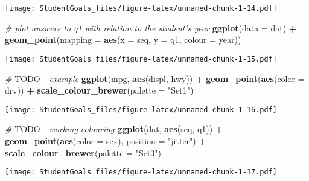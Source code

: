 \documentclass[]{article}
\newenvironment{Shaded}{\begin{snugshade}}{\end{snugshade}}
\newcommand{\AlertTok}[1]{\textcolor[rgb]{0.94,0.16,0.16}{#1}}
\newcommand{\CommentTok}[1]{\textcolor[rgb]{0.56,0.35,0.01}{\textit{#1}}}
\newcommand{\DataTypeTok}[1]{\textcolor[rgb]{0.13,0.29,0.53}{#1}}
\newcommand{\KeywordTok}[1]{\textcolor[rgb]{0.13,0.29,0.53}{\textbf{#1}}}
\newcommand{\NormalTok}[1]{#1}
\newcommand{\OperatorTok}[1]{\textcolor[rgb]{0.81,0.36,0.00}{\textbf{#1}}}
\newcommand{\StringTok}[1]{\textcolor[rgb]{0.31,0.60,0.02}{#1}}
\begin{document}
\texttt{[image: StudentGoals\_files/figure-latex/unnamed-chunk-1-14.pdf]}

\begin{Shaded}
\begin{Highlighting}[]
\CommentTok{# plot answers to q1 with relation to the student's year}
\KeywordTok{ggplot}\NormalTok{(}\DataTypeTok{data =}\NormalTok{ dat) }\OperatorTok{+}\StringTok{ }
\StringTok{  }\KeywordTok{geom_point}\NormalTok{(}\DataTypeTok{mapping =} \KeywordTok{aes}\NormalTok{(}\DataTypeTok{x =}\NormalTok{ seq, }\DataTypeTok{y =}\NormalTok{ q1, }\DataTypeTok{colour =}\NormalTok{ year))}
\end{Highlighting}
\end{Shaded}

\texttt{[image: StudentGoals\_files/figure-latex/unnamed-chunk-1-15.pdf]}

\begin{Shaded}
\begin{Highlighting}[]
\CommentTok{# }\AlertTok{TODO}\CommentTok{ - example}
\KeywordTok{ggplot}\NormalTok{(mpg, }\KeywordTok{aes}\NormalTok{(displ, hwy)) }\OperatorTok{+}
\StringTok{  }\KeywordTok{geom_point}\NormalTok{(}\KeywordTok{aes}\NormalTok{(}\DataTypeTok{color =}\NormalTok{ drv)) }\OperatorTok{+}
\StringTok{  }\KeywordTok{scale_colour_brewer}\NormalTok{(}\DataTypeTok{palette =} \StringTok{"Set1"}\NormalTok{)}
\end{Highlighting}
\end{Shaded}

\texttt{[image: StudentGoals\_files/figure-latex/unnamed-chunk-1-16.pdf]}

\begin{Shaded}
\begin{Highlighting}[]
\CommentTok{# }\AlertTok{TODO}\CommentTok{ - working colouring}
\KeywordTok{ggplot}\NormalTok{(dat, }\KeywordTok{aes}\NormalTok{(seq, q1)) }\OperatorTok{+}\StringTok{ }\KeywordTok{geom_point}\NormalTok{(}\KeywordTok{aes}\NormalTok{(}\DataTypeTok{color =}\NormalTok{ sex), }\DataTypeTok{position =} \StringTok{"jitter"}\NormalTok{) }\OperatorTok{+}
\StringTok{  }\KeywordTok{scale_colour_brewer}\NormalTok{(}\DataTypeTok{palette =} \StringTok{"Set3"}\NormalTok{)}
\end{Highlighting}
\end{Shaded}

\texttt{[image: StudentGoals\_files/figure-latex/unnamed-chunk-1-17.pdf]}
\end{document}
